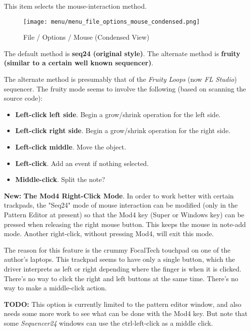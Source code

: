    This item selects the mouse-interaction method.

\begin{figure}[H]
   \centering 
   \texttt{[image: menu/menu\_file\_options\_mouse\_condensed.png]}
   \caption{File / Options / Mouse (Condensed View)}
   \label{fig:seq24_menu_file_options_mouse}
\end{figure}

   The default method is \textbf{seq24 (original style)}.
   The alternate method is \textbf{fruity (similar to a certain well known
   sequencer)}.

   The alternate method is presumably that of the \textsl{Fruity Loops}
   (now \textsl{FL Studio}) sequencer.  The fruity mode seems to involve the
   following (based on scanning the source code):
   
   \begin{itemize}
      \item \textbf{Left-click left side}.
         Begin a grow/shrink operation for the left side.
      \item \textbf{Left-click right side}.
         Begin a grow/shrink operation for the right side.
      \item \textbf{Left-click middle}.
         Move the object.
      \item \textbf{Left-click}.
         Add an event if nothing selected.
      \item \textbf{Middle-click}.
         Split the note?
   \end{itemize}

   \textbf{New:}
   \label{new_mod4_mode}
   \textbf{The Mod4 Right-Click Mode}.
   In order to work better with certain trackpads, the
   "Seq24" mode of mouse interaction can be modified (only in the
   Pattern Editor at present) so that the Mod4 key (Super or Windows key)
   can be pressed when releasing the right mouse button.
   This keeps the mouse in note-add mode.
   Another right-click, without pressing Mod4, will exit this mode.

   The reason for this feature is the crummy FocalTech touchpad on one of
   the author's laptops.  This trackpad seems to have only a single button,
   which the driver interprets as left or right depending where the finger
   is when it is clicked.  There's no way to click the right and left
   buttons at the same time.  There's no way to make a middle-click action.

   \textbf{TODO:}
   This option is currently limited to the pattern editor window, and also
   needs some more work to see what can be done with the Mod4 key.  But
   note that some \textsl{Sequencer24} windows can use the ctrl-left-click
   as a middle click. 

